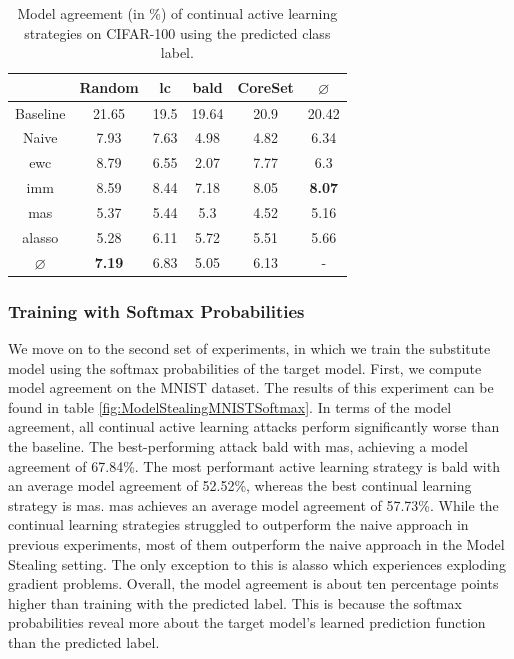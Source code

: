 \begin{table}[h]
    \centering
    \begin{tabular}{ c | c c c c | c } 
         & Random & \gls{lc} & \gls{bald} & CoreSet & $\varnothing$\\ 
        \hline
        Baseline & 21.65 & 19.5 & 19.64 & 20.9 & 20.42\\
        \hline
        Naive & 7.93 & 7.63 & 4.98 & 4.82 & 6.34\\
        \gls{ewc} & 8.79 & 6.55 & 2.07 & 7.77 & 6.3\\
        \gls{imm} & 8.59 & 8.44 & 7.18 & 8.05 & \textbf{8.07}\\
        \gls{mas} & 5.37 & 5.44 & 5.3 & 4.52 & 5.16\\
        \gls{alasso} & 5.28 & 6.11 & 5.72 & 5.51 & 5.66\\
        \hline
        $\varnothing$ & \textbf{7.19} & 6.83 & 5.05 & 6.13 & -\\
    \end{tabular}
    \caption{Model agreement (in \%) of continual active learning strategies on CIFAR-100 using the predicted class label.}
    \label{fig:ModelStealingCIFAR100Label}
\end{table}




\subsubsection{Training with Softmax Probabilities}
\label{sec:Evaluation:MS:Regularization:Softmax}

We move on to the second set of experiments, in which we train the substitute model using the softmax probabilities of the target model. First, we compute model agreement
on the MNIST dataset. The results of this experiment can be found in table \ref{fig:ModelStealingMNISTSoftmax}. In terms of the model agreement, all continual
active learning attacks perform significantly worse than the baseline. The best-performing attack \gls{bald} with \gls{mas}, achieving a model
agreement of 67.84\%. The most performant active learning strategy is \gls{bald} with an average model agreement of 52.52\%, whereas the best continual learning strategy is
\gls{mas}. \gls{mas} achieves an average model agreement of 57.73\%. While the continual learning strategies struggled to outperform the naive approach in previous experiments,
most of them outperform the naive approach in the Model Stealing setting. The only exception to this is \gls{alasso} which experiences exploding gradient problems. Overall,
the model agreement is about ten percentage points higher than training with the predicted label. This is because the softmax probabilities reveal more about the target model's
learned prediction function than the predicted label. \par 

